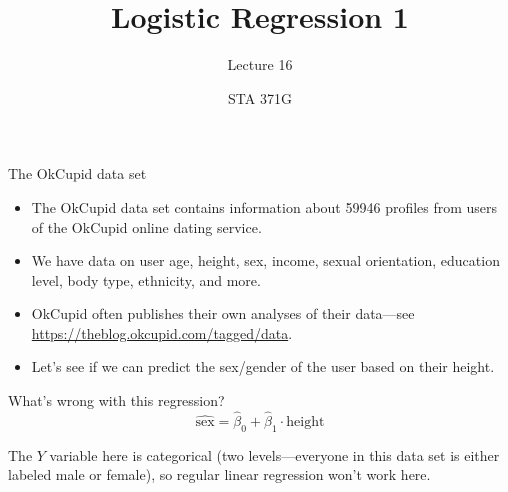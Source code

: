 \documentclass{beamer}\usepackage[]{graphicx}\usepackage[]{color}
\title{Logistic Regression 1}
\subtitle{Lecture 16}
\author{STA 371G}
\begin{document}
  
  

  \frame{\maketitle}



  \begin{darkframes}
    \begin{frame}
    \end{frame}

    \begin{frame}{The OkCupid data set}
      \begin{itemize}
        \item The OkCupid data set contains information about 59946 profiles from users of the OkCupid online dating service.
        \item We have data on user age, height, sex, income, sexual orientation, education level, body type, ethnicity, and more.
        \item OkCupid often publishes their own analyses of their data---see \url{https://theblog.okcupid.com/tagged/data}.
        \item Let's see if we can predict the sex/gender of the user based on their height.
      \end{itemize}
    \end{frame}

    \begin{frame}{What's wrong with this regression?}
      \[
        \widehat{\text{sex}} = \hat\beta_0 + \hat\beta_1\cdot\text{height}
      \]

      \pause

      \begin{center}
        The $Y$ variable here is \alert{categorical} (two levels---everyone in this data set is either labeled male or female), so regular linear regression won't work here.
      \end{center}
    \end{frame}


\end{darkframes}
\end{document}

